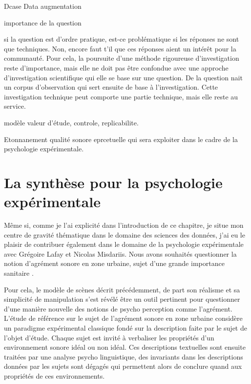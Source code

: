 Dcase  \cite{mesa} Data augmentation

importance de la question

si la question est d'ordre pratique, est-ce problématique si les réponses ne sont que techniques. Non, encore faut t'il que ces réponses aient un intérêt pour la communauté. Pour cela, la poursuite d'une méthode rigoureuse d'investigation reste d'importance, mais elle ne doit pas être confondue avec une approche d'investigation scientifique qui elle se base sur une question. De la question nait un corpus d'observation qui sert ensuite de base à l'investigation. Cette investigation technique peut comporte une partie technique, mais elle reste au service.

modèle valeur d'étude, controle, replicabilite.

Etonnanement qualité sonore eprcetuelle qui sera exploiter dans le cadre de la psychologie expérimentale.

\section{La synthèse pour la psychologie expérimentale}

Même si, comme je l'ai explicité dans l'introduction de ce chapitre, je situe mon centre de gravité thématique dans le domaine des sciences des données, j'ai eu le plaisir de contribuer également dans le domaine de la psychologie expérimentale avec Grégoire Lafay et Nicolas Misdariis. Nous avons souhaités questionner la notion d'agrément sonore en zone urbaine, sujet d'une grande importance sanitaire \cite{europe}.

Pour cela, le modèle de scènes décrit précédemment, de part son réalisme et sa simplicité de manipulation s'est révélé être un outil pertinent pour questionner d'une manière nouvelle des notions de psycho perception comme l'agrément. L'étude de référence sur le sujet de l'agrément sonore en zone urbaine \cite{guastavino} considère un paradigme expérimental classique fondé sur la description faite par le sujet de l'objet d'étude. Chaque sujet est invité à verbaliser les propriétés d'un environnement sonore idéal ou non idéal. Ces descriptions textuelles sont ensuite traitées par une analyse psycho linguistique, des invariants dans les descriptions données par les sujets sont dégagés qui permettent alors de conclure quand aux propriétés de ces environnements.

